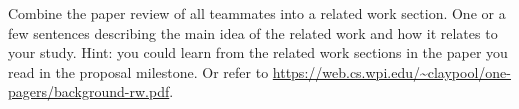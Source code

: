
Combine the paper review of all teammates into a related work section. One or a few sentences describing the main idea of the related work and how it relates to your study. Hint: you could learn from the related work sections in the paper you read in the proposal milestone. Or refer to \url{https://web.cs.wpi.edu/~claypool/one-pagers/background-rw.pdf}.